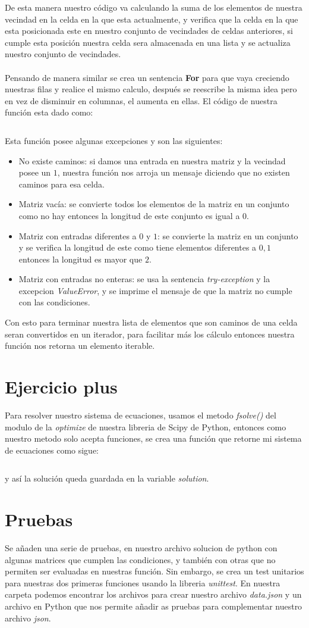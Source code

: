 \documentclass{article}
\begin{document}
	De esta manera nuestro código va calculando la suma de los elementos de nuestra vecindad en la celda en la que esta actualmente, y verifica que la celda en la que esta posicionada este en nuestro conjunto de vecindades de celdas anteriores, si cumple esta posición nuestra celda sera almacenada en una lista y se actualiza nuestro conjunto de vecindades.\\ \\
	Pensando de manera similar se crea un sentencia \textbf{For} para que vaya creciendo nuestras filas y realice el mismo calculo, después se reescribe la misma idea pero en vez de disminuir en columnas, el aumenta en ellas. El código de nuestra función esta dado como:
	\inputminted{python}{codigos/iter.py}
	Esta función posee algunas excepciones y son las siguientes:
	\begin{itemize}
		\item No existe caminos: si damos una entrada en nuestra matriz y la vecindad posee un $1$, nuestra función nos arroja un mensaje diciendo que no existen caminos para esa celda.
		\item Matriz vacía: se convierte todos los elementos de la matriz en un conjunto como no hay entonces la longitud de este conjunto es igual a $0$.
		\item Matriz con entradas diferentes a $0$ y $1$: se convierte la matriz en un conjunto y se verifica la longitud de este como tiene elementos diferentes a $0,1$ entonces la longitud es mayor que $2$.
		\item Matriz con entradas no enteras: se usa la sentencia \textit{try-exception} y la excepcion \textit{ValueError}, y se imprime el mensaje de que la matriz no cumple con las condiciones.
	\end{itemize}

	Con esto para terminar nuestra lista de elementos que son caminos de una celda seran convertidos en un iterador, para facilitar más los cálculo entonces nuestra función nos retorna un elemento iterable.
	\section*{Ejercicio plus}
	Para resolver nuestro sistema de ecuaciones, usamos el metodo \textit{fsolve()} del modulo de la \textit{optimize} de nuestra libreria de Scipy de Python, entonces como nuestro metodo solo acepta funciones, se crea una función que retorne mi sistema de ecuaciones como sigue:
	\inputminted{python}{codigos/solution.py}
	y así la solución queda guardada en la variable \textit{solution}.
	
	\section*{Pruebas}
	Se añaden una serie de pruebas, en nuestro archivo solucion de python con algunas matrices que cumplen las condiciones, y también con otras que no permiten ser evaluadas en nuestras función.
	Sin embargo, se crea un test unitarios para nuestras dos primeras funciones usando la libreria \textit{unittest}. En nuestra carpeta podemos encontrar los archivos para crear nuestro archivo \textit{data.json} y un archivo en Python que nos permite añadir as pruebas para complementar nuestro archivo \textit{json}.
	
	
\end{document}
